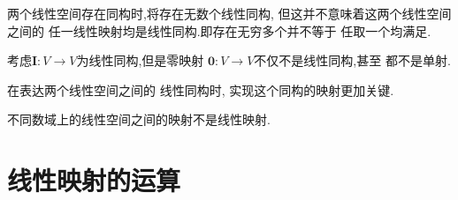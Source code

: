 \begin{red}
\begin{remark}
    两个线性空间存在同构时,将存在无数个线性同构,
    但这并不意味着这两个线性空间之间的
    任一线性映射均是线性同构.即存在无穷多个并不等于
    任取一个均满足.
\end{remark}
\end{red}
    \begin{brown}
    \begin{example}
        考虑$\bm{I}:V\longrightarrow V$为线性同构,但是零映射
        $\bm{0}:V\longrightarrow V$不仅不是线性同构,甚至
        都不是单射.
    \end{example}
    \end{brown}
    \begin{red}
    \begin{remark}
        在表达两个线性空间之间的
        线性同构时,
        实现这个同构的映射更加关键.
    \end{remark}
    \end{red}
    \begin{red}
\begin{remark}
    不同数域上的线性空间之间的映射不是线性映射.
\end{remark}
\end{red}
\newpage
\section{线性映射的运算}
